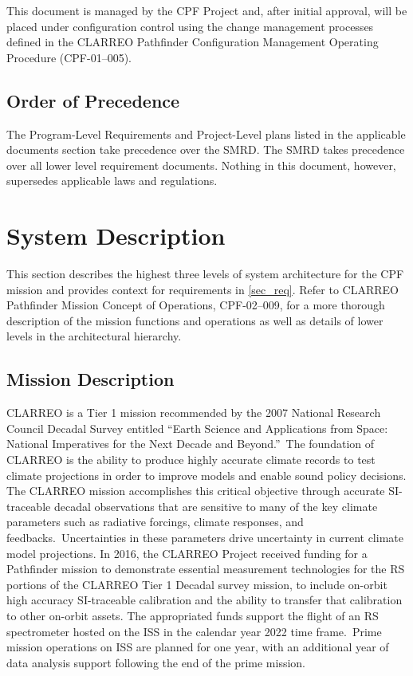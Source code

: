 \documentclass[12pt,oneside,oldfontcommands]{memoir}
\begin{document}
This document is managed by the \gls{CPF} Project and, after initial approval, will be placed under configuration control using the change management processes defined in the \gls{CLARREO} Pathfinder Configuration Management Operating Procedure (CPF-01--005).

\section{Order of Precedence }
\label{orderofprecedence}

The Program-Level Requirements and Project-Level plans listed in the applicable documents section take precedence over the \gls{SMRD}. The \gls{SMRD} takes precedence over all lower level requirement documents. Nothing in this document, however, supersedes applicable laws and regulations.

\chapter{System Description  }
\label{sec_desc}

This section describes the highest three levels of system architecture for the \gls{CPF} mission and provides context for requirements in \autoref{sec_req}. Refer to \gls{CLARREO} Pathfinder Mission Concept of Operations, \gls{CPF}-02--009, for a more thorough description of the mission functions and operations as well as details of lower levels in the architectural hierarchy.

\section{Mission Description }
\label{missiondescription}

\gls{CLARREO} is a Tier 1 mission recommended by the 2007 National Research Council Decadal Survey entitled ``Earth Science and Applications from Space: National Imperatives for the Next Decade and Beyond.'' The foundation of \gls{CLARREO} is the ability to produce highly accurate climate records to \gls{test} climate projections in order to improve models and enable sound policy decisions. The \gls{CLARREO} mission accomplishes this critical objective through accurate \gls{SI}-traceable decadal observations that are sensitive to many of the key climate parameters such as radiative forcings, climate responses, and feedbacks. Uncertainties in these parameters drive uncertainty in current climate model projections. In 2016, the \gls{CLARREO} Project received funding for a Pathfinder mission to demonstrate essential \gls{measure}ment technologies for the \gls{RS} portions of the \gls{CLARREO} Tier 1 Decadal survey mission, to include on-orbit high accuracy \gls{SI}-traceable calibration and the ability to transfer that calibration to other on-orbit assets. The appropriated funds support the flight of an \gls{RS} spectrometer hosted on the \gls{ISS} in the calendar year 2022 time frame. Prime mission operations on \gls{ISS} are planned for one year, with an additional year of data \gls{analysis} support following the end of the prime mission.
\end{document}
